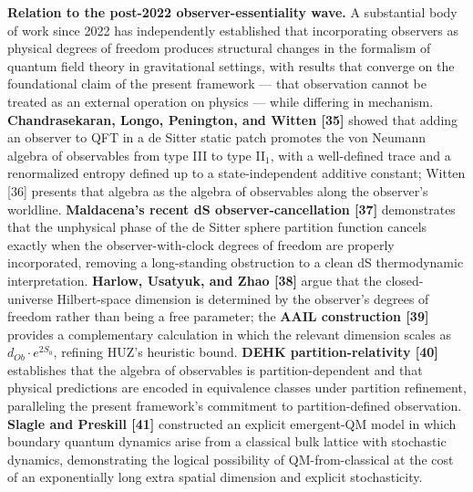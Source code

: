 \documentclass[
]{article}
\begin{document}
\textbf{Relation to the post-2022 observer-essentiality wave.} A
substantial body of work since 2022 has independently established that
incorporating observers as physical degrees of freedom produces
structural changes in the formalism of quantum field theory in
gravitational settings, with results that converge on the foundational
claim of the present framework --- that observation cannot be treated as
an external operation on physics --- while differing in mechanism.
\textbf{Chandrasekaran, Longo, Penington, and Witten {[}35{]}} showed
that adding an observer to QFT in a de Sitter static patch promotes the
von Neumann algebra of observables from type III to type II\(_1\), with
a well-defined trace and a renormalized entropy defined up to a
state-independent additive constant; Witten {[}36{]} presents that
algebra as the algebra of observables along the observer's worldline.
\textbf{Maldacena's recent dS observer-cancellation {[}37{]}}
demonstrates that the unphysical phase of the de Sitter sphere partition
function cancels exactly when the observer-with-clock degrees of freedom
are properly incorporated, removing a long-standing obstruction to a
clean dS thermodynamic interpretation. \textbf{Harlow, Usatyuk, and Zhao
{[}38{]}} argue that the closed-universe Hilbert-space dimension is
determined by the observer's degrees of freedom rather than being a free
parameter; the \textbf{AAIL construction {[}39{]}} provides a
complementary calculation in which the relevant dimension scales as
\(d_{Ob} \cdot e^{2S_0}\), refining HUZ's heuristic bound. \textbf{DEHK
partition-relativity {[}40{]}} establishes that the algebra of
observables is partition-dependent and that physical predictions are
encoded in equivalence classes under partition refinement, paralleling
the present framework's commitment to partition-defined observation.
\textbf{Slagle and Preskill {[}41{]}} constructed an explicit
emergent-QM model in which boundary quantum dynamics arise from a
classical bulk lattice with stochastic dynamics, demonstrating the
logical possibility of QM-from-classical at the cost of an exponentially
long extra spatial dimension and explicit stochasticity.
\end{document}
